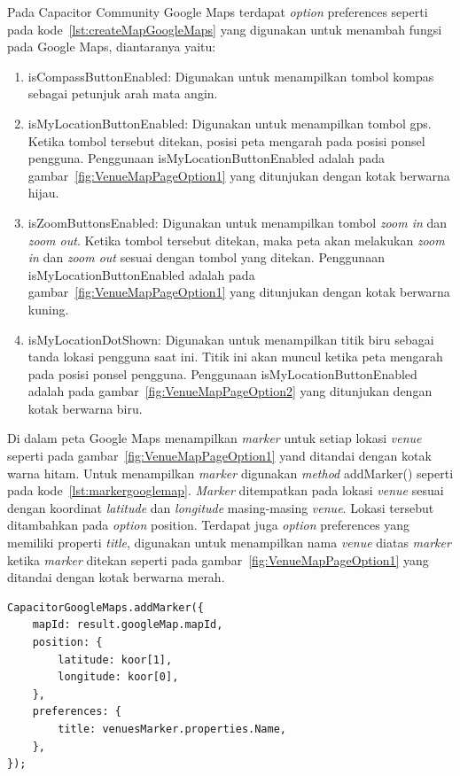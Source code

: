 \begin{itemize}
	Pada Capacitor Community Google Maps terdapat \textit{option} preferences seperti pada kode~\ref{lst:createMapGoogleMaps} yang digunakan untuk menambah fungsi pada Google Maps, diantaranya yaitu:
	
	\begin{enumerate}
		\item isCompassButtonEnabled: Digunakan untuk menampilkan tombol kompas sebagai petunjuk arah mata angin.
		\item isMyLocationButtonEnabled: Digunakan untuk menampilkan tombol gps. Ketika tombol tersebut ditekan, posisi peta mengarah pada posisi ponsel pengguna. Penggunaan isMyLocationButtonEnabled adalah pada gambar~\ref{fig:VenueMapPageOption1} yang ditunjukan dengan kotak berwarna hijau.
		\item isZoomButtonsEnabled: Digunakan untuk menampilkan tombol \textit{zoom in} dan \textit{zoom out}. Ketika tombol tersebut ditekan, maka peta akan melakukan \textit{zoom in} dan \textit{zoom out} sesuai dengan tombol yang ditekan. Penggunaan isMyLocationButtonEnabled adalah pada gambar~\ref{fig:VenueMapPageOption1} yang ditunjukan dengan kotak berwarna kuning.
		\item isMyLocationDotShown: Digunakan untuk menampilkan titik biru sebagai tanda lokasi pengguna saat ini. Titik ini akan muncul ketika peta mengarah pada posisi ponsel pengguna. Penggunaan isMyLocationButtonEnabled adalah pada gambar~\ref{fig:VenueMapPageOption2} yang ditunjukan dengan kotak berwarna biru.
	\end{enumerate}
	
	Di dalam peta Google Maps menampilkan \textit{marker} untuk setiap lokasi \textit{venue} seperti pada gambar~\ref{fig:VenueMapPageOption1} yand ditandai dengan kotak warna hitam. Untuk menampilkan \textit{marker} digunakan \textit{method} addMarker() seperti pada kode~\ref{lst:markergooglemap}. \textit{Marker} ditempatkan pada lokasi \textit{venue} sesuai dengan koordinat \textit{latitude} dan \textit{longitude} masing-masing \textit{venue}. Lokasi tersebut ditambahkan pada \textit{option} position. Terdapat juga \textit{option} preferences yang memiliki properti \textit{title}, digunakan untuk menampilkan nama \textit{venue} diatas \textit{marker} ketika \textit{marker} ditekan seperti pada gambar~\ref{fig:VenueMapPageOption1} yang ditandai dengan kotak berwarna merah.

\begin{lstlisting}[label={lst:markergooglemap}, caption=\textit{Method} addMarker() Pada Capacitor Community Google Maps]
CapacitorGoogleMaps.addMarker({
	mapId: result.googleMap.mapId,
    position: {
    	latitude: koor[1],
        longitude: koor[0],
    },
    preferences: {
        title: venuesMarker.properties.Name,
    },
});
\end{lstlisting}


\end{itemize}
